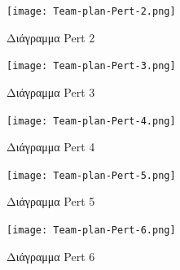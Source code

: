 \documentclass{article}
\begin{document}
 
\begin{figure}[!htb]
\centering
\texttt{[image: Team-plan-Pert-2.png]}
\caption{\label{fig:log in page}Διάγραμμα Pert  2}
\end{figure}


\begin{figure}[!htb]
\centering
\texttt{[image: Team-plan-Pert-3.png]}
\caption{\label{fig:log in page}Διάγραμμα Pert  3}
\end{figure}

\begin{figure}[!htb]
\centering
\texttt{[image: Team-plan-Pert-4.png]}
\caption{\label{fig:log in page}Διάγραμμα Pert  4}
\end{figure}

\begin{figure}[!htb]
\centering
\texttt{[image: Team-plan-Pert-5.png]}
\caption{\label{fig:log in page}Διάγραμμα Pert  5}
\end{figure}
\begin{figure}[!htb]
\centering
\texttt{[image: Team-plan-Pert-6.png]}
\caption{\label{fig:log in page}Διάγραμμα Pert 6}
\end{figure}


\newpage
\end{document}
